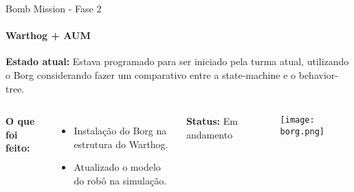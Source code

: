 \begin{frame}[t]{Bomb Mission - Fase 2} 
    \framesubtitle{Warthog + AUM}

    \textbf{Estado atual:} Estava programado para ser iniciado pela turma atual, utilizando o Borg considerando fazer um comparativo entre a state-machine e o behavior-tree.

    \vspace*{0.3cm}
        \begin{columns}[t]

            \textbf{O que foi feito:}
            \begin{itemize}
                \item Instalação do Borg na estrutura do Warthog.
                \item Atualizado o modelo do robô na simulação.
            \end{itemize}
            \vspace*{0.5cm}

            \textbf{Status:} Em andamento
            \begin{center}
                \begin{figure}
                    \texttt{[image: borg.png]}
                \end{figure}
            \end{center}
        \end{columns}
\end{frame}
